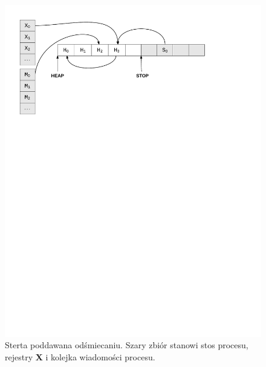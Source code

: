 \begin{figure}[p]
\centerline{\includegraphics[scale=0.75, clip, trim=10mm 185mm 45mm 10mm]{gc_0}}
\caption{Sterta poddawana odśmiecaniu. Szary zbiór stanowi stos procesu, rejestry \textbf{X} i kolejka wiadomości procesu.}
\label{fig:gc0}


\end{figure}
